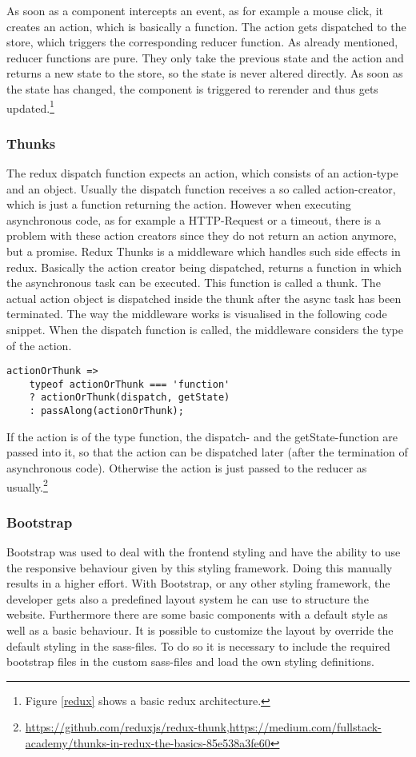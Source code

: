As soon as a component intercepts an event, as for example a mouse click, it creates an action, which is basically a function. The action gets dispatched to the store, which triggers the corresponding reducer function. As already mentioned, reducer functions are pure. They only take the previous state and the action and returns a new state to the store, so the state is never altered directly. As soon as the state has changed, the component is triggered to rerender and thus gets updated.\footnote{Figure \ref{redux} shows a basic redux architecture.}

\subsubsection{Thunks}

The redux dispatch function expects an action, which consists of an action-type and an object. Usually the dispatch function receives a so called action-creator, which is just a function returning the action. 
However when executing asynchronous code, as for example a HTTP-Request or a timeout, there is a problem with these action creators since they do not return an action anymore, but a promise.
Redux Thunks is a middleware which handles such side effects in redux. Basically the action creator being dispatched, returns a function in which the asynchronous task can be executed. This function is called a thunk. The actual action object is dispatched inside the thunk after the async task has been terminated.
The way the middleware works is visualised in the following code snippet. When the dispatch function is called, the middleware considers the type of the action.

\begin{lstlisting}[frame=single, backgroundcolor=\color{light-gray}]
actionOrThunk =>
	typeof actionOrThunk === 'function'
	? actionOrThunk(dispatch, getState)
	: passAlong(actionOrThunk);
\end{lstlisting}

If the action is of the type function, the dispatch- and the getState-function are passed into it, so that the action can be dispatched later (after the termination of asynchronous code).
Otherwise the action is just passed to the reducer as usually.\footnote{\url{https://github.com/reduxjs/redux-thunk},\url{https://medium.com/fullstack-academy/thunks-in-redux-the-basics-85e538a3fe60}}

\subsubsection{Bootstrap}
Bootstrap was used to deal with the frontend styling and have the ability to use the responsive behaviour given by this styling framework. Doing this manually results in a higher effort. With Bootstrap, or any other styling framework, the developer gets also a predefined layout  system he can use to structure the website. Furthermore there are some basic components with a default style as well as a basic behaviour. It is possible to customize the layout by override the default styling in the sass-files. To do so it is necessary to include the required bootstrap files in the custom sass-files and load the own styling definitions.

